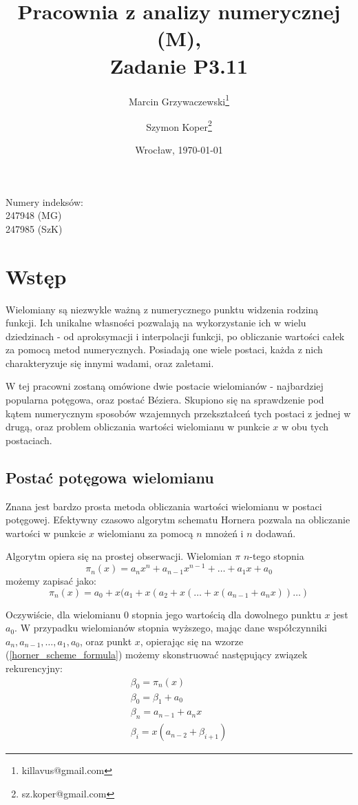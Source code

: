 \documentclass[wide, 11pt]{mwart}
\date{Wrocław, \today}
\title{Pracownia z analizy numerycznej (M),\\[8pt]\large{Zadanie P3.11}}
\author{Marcin Grzywaczewski\footnote{killavus@gmail.com} \and Szymon Koper\footnote{sz.koper@gmail.com}}
\begin{document}
	\maketitle
	\begin{center}
	Numery indeksów:\\247948 (MG)\\247985 (SzK)
	\end{center}
	\thispagestyle{empty}
	\newpage

\section{Wstęp}
Wielomiany są niezwykle ważną z numerycznego punktu widzenia rodziną funkcji.
Ich unikalne własności pozwalają na wykorzystanie ich w wielu dziedzinach -
od aproksymacji i interpolacji funkcji, po obliczanie wartości całek za pomocą
metod numerycznych. Posiadają one wiele postaci, każda z nich charakteryzuje
się innymi wadami, oraz zaletami.

W tej pracowni zostaną omówione dwie postacie wielomianów - najbardziej 
popularna potęgowa, oraz postać Béziera. Skupiono się na sprawdzenie pod kątem
numerycznym sposobów wzajemnych przekształceń tych postaci z jednej w drugą,
oraz problem obliczania wartości wielomianu w punkcie $x$ w obu tych 
postaciach.

\subsection{Postać potęgowa wielomianu}
Znana jest bardzo prosta metoda obliczania wartości wielomianu w postaci
potęgowej. Efektywny czasowo algorytm schematu Hornera pozwala na obliczanie
wartości w punkcie $x$ wielomianu za pomocą $n$ mnożeń i $n$ dodawań.

Algorytm opiera się na prostej obserwacji. Wielomian $\pi$ $n$-tego stopnia
\[\pi_n(x) = a_nx^n + a_{n-1}x^{n-1} + \ldots + a_1x + a_0\] możemy zapisać 
jako:
\begin{equation}
  \label{horner_scheme_formula}
  \pi_n(x) = a_0 + x(a_1 + x(a_2 + x(\ldots + x(a_{n-1} + a_nx))\ldots)
\end{equation}

Oczywiście, dla wielomianu $0$ stopnia jego wartością dla dowolnego punktu $x$
jest $a_0$. W przypadku wielomianów stopnia wyższego, mając dane współczynniki
$a_n, a_{n-1}, \ldots, a_1, a_0$, oraz punkt $x$, opierając się na wzorze 
(\ref{horner_scheme_formula}) możemy skonstruować następujący związek 
rekurencyjny:
\begin{subequations}
  \begin{align}
    \beta_0 = \pi_n(x)\\
    \beta_0 = \beta_1 + a_0\\
    \beta_n = a_{n-1} + a_nx\\
    \beta_i = x(a_{n-2} + \beta_{i+1})
  \end{align}
\end{subequations}
\end{document}
